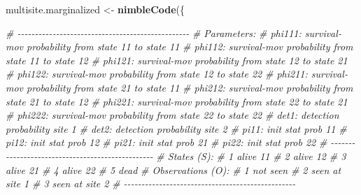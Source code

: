 \documentclass[
  12pt,
]{krantz}
\newenvironment{Shaded}{\begin{snugshade}}{\end{snugshade}}
\newcommand{\CommentTok}[1]{\textcolor[rgb]{0.56,0.35,0.01}{\textit{#1}}}
\newcommand{\FunctionTok}[1]{\textcolor[rgb]{0.13,0.29,0.53}{\textbf{#1}}}
\newcommand{\NormalTok}[1]{#1}
\newcommand{\OtherTok}[1]{\textcolor[rgb]{0.56,0.35,0.01}{#1}}
\begin{document}
\begin{Shaded}
\begin{Highlighting}[]
\NormalTok{multisite.marginalized }\OtherTok{\textless{}{-}} \FunctionTok{nimbleCode}\NormalTok{(\{}
  
  \CommentTok{\# {-}{-}{-}{-}{-}{-}{-}{-}{-}{-}{-}{-}{-}{-}{-}{-}{-}{-}{-}{-}{-}{-}{-}{-}{-}{-}{-}{-}{-}{-}{-}{-}{-}{-}{-}{-}{-}{-}{-}{-}{-}{-}{-}{-}{-}{-}{-}{-}{-}}
  \CommentTok{\# Parameters:}
  \CommentTok{\# phi111: survival{-}mov probability from state 11 to state 11}
  \CommentTok{\# phi112: survival{-}mov probability from state 11 to state 12}
  \CommentTok{\# phi121: survival{-}mov probability from state 12 to state 21}
  \CommentTok{\# phi122: survival{-}mov probability from state 12 to state 22}
  \CommentTok{\# phi211: survival{-}mov probability from state 21 to state 11}
  \CommentTok{\# phi212: survival{-}mov probability from state 21 to state 12}
  \CommentTok{\# phi221: survival{-}mov probability from state 22 to state 21}
  \CommentTok{\# phi222: survival{-}mov probability from state 22 to state 22}
  \CommentTok{\# det1: detection probability site 1}
  \CommentTok{\# det2: detection probability site 2}
  \CommentTok{\# pi11: init stat prob 11}
  \CommentTok{\# pi12: init stat prob 12}
  \CommentTok{\# pi21: init stat prob 21}
  \CommentTok{\# pi22: init stat prob 22}
  \CommentTok{\# {-}{-}{-}{-}{-}{-}{-}{-}{-}{-}{-}{-}{-}{-}{-}{-}{-}{-}{-}{-}{-}{-}{-}{-}{-}{-}{-}{-}{-}{-}{-}{-}{-}{-}{-}{-}{-}{-}{-}{-}{-}{-}{-}{-}{-}{-}{-}{-}{-}}
  \CommentTok{\# States (S):}
  \CommentTok{\# 1 alive 11}
  \CommentTok{\# 2 alive 12}
  \CommentTok{\# 3 alive 21}
  \CommentTok{\# 4 alive 22}
  \CommentTok{\# 5 dead}
  \CommentTok{\# Observations (O):  }
  \CommentTok{\# 1 not seen}
  \CommentTok{\# 2 seen at site 1 }
  \CommentTok{\# 3 seen at site 2}
  \CommentTok{\# {-}{-}{-}{-}{-}{-}{-}{-}{-}{-}{-}{-}{-}{-}{-}{-}{-}{-}{-}{-}{-}{-}{-}{-}{-}{-}{-}{-}{-}{-}{-}{-}{-}{-}{-}{-}{-}{-}{-}{-}{-}{-}{-}{-}{-}{-}{-}{-}{-}}
  

\end{Highlighting}
\end{Shaded}
\end{document}
